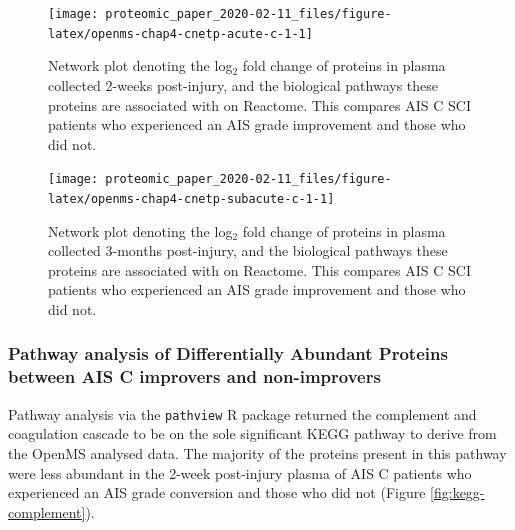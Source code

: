 \documentclass[9pt,lineno]{elife}
\begin{document}
\begin{landscape}



\begin{figure}

{\centering \texttt{[image: proteomic\_paper\_2020-02-11\_files/figure-latex/openms-chap4-cnetp-acute-c-1-1]} 

}

\caption{Network plot denoting the log\(_2\) fold change of proteins in plasma collected 2-weeks post-injury, and the biological pathways these proteins are associated with on Reactome. This compares AIS C SCI patients who experienced an AIS grade improvement and those who did not.}\label{fig:openms-chap4-cnetp-acute-c-1}
\end{figure}

\end{landscape}
\begin{landscape}



\begin{figure}

{\centering \texttt{[image: proteomic\_paper\_2020-02-11\_files/figure-latex/openms-chap4-cnetp-subacute-c-1-1]} 

}

\caption{Network plot denoting the log\(_2\) fold change of proteins in plasma collected 3-months post-injury, and the biological pathways these proteins are associated with on Reactome. This compares AIS C SCI patients who experienced an AIS grade improvement and those who did not.}\label{fig:openms-chap4-cnetp-subacute-c-1}
\end{figure}

\end{landscape}
\clearpage

\hypertarget{kegg-chap3}{%
\subsubsection{Pathway analysis of Differentially Abundant Proteins between AIS C improvers and non-improvers}\label{kegg-chap3}}

Pathway analysis via the \texttt{pathview} R package returned the complement and coagulation cascade to be on the sole significant KEGG pathway to derive from the OpenMS analysed data.
The majority of the proteins present in this pathway were less abundant in the 2-week post-injury plasma of AIS C patients who experienced an AIS grade conversion and those who did not (Figure \ref{fig:kegg-complement}).
\end{document}

